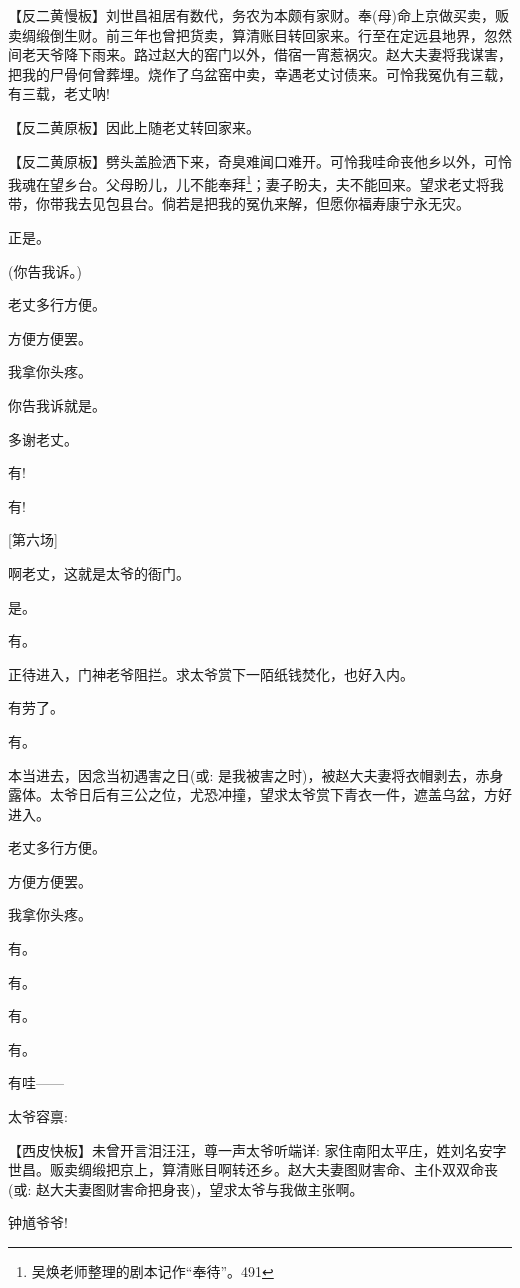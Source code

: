 \setlength{\hangindent}{60pt} {【{\akai 反二黄慢板}】刘世昌祖居有数代，务农为本颇有家财。奉(母)命上京做买卖，贩卖绸缎倒生财。前三年也曾把货卖，算清账目转回家来。行至在定远县地界，忽然间老天爷降下雨来。路过赵大的窑门以外，借宿一宵惹祸灾。赵大夫妻将我谋害，把我的尸骨何曾葬埋。烧作了乌盆窑中卖，幸遇老丈讨债来。可怜我冤仇有三载，有三载，老丈呐!}

\setlength{\hangindent}{60pt} {【{\akai 反二黄原板}】因此上随老丈转回家来。}

\setlength{\hangindent}{60pt} {【{\akai 反二黄原板}】劈头盖脸洒下来，奇臭难闻口难开。可怜我哇命丧他乡以外，可怜我魂在望乡台。父母盼儿，儿不能奉拜}\footnote{ 吴焕老师整理的剧本记作``奉待''。{491}}{；妻子盼夫，夫不能回来。望求老丈将我带，你带我去见包县台。倘若是把我的冤仇来解，但愿你福寿康宁永无灾。}

{正是。}

{(你告我诉。)}

{老丈多行方便。}

{方便方便罢。}

{我拿你头疼。}

{你告我诉就是。}

{多谢老丈。}

{有!}

{有!}

{[}第六场{]}

{啊老丈，这就是太爷的衙门。}

{是。}

{有。}

{正待进入，门神老爷阻拦。求太爷赏下一陌纸钱焚化，也好入内。}

{有劳了。}

{有。}

{本当进去，因念当初遇害之日({\akai 或}: 是我被害之时)，被赵大夫妻将衣帽剥去，赤身露体。太爷日后有三公之位，尤恐冲撞，望求太爷赏下青衣一件，遮盖乌盆，方好进入。}

{老丈多行方便。}

{方便方便罢。}

{我拿你头疼。}

{有。}

{有。}

{有。}

{有。}

{有哇------}

{太爷容禀: }

\setlength{\hangindent}{60pt} {【{\akai 西皮快板}】未曾开言泪汪汪，尊一声太爷听端详: 家住南阳太平庄，姓刘名安字世昌。贩卖绸缎把京上，算清账目啊转还乡。赵大夫妻图财害命、主仆双双命丧({\akai 或}: }赵大夫妻图财害命把身丧{)，望求太爷与我做主张啊。}

钟馗爷爷!
